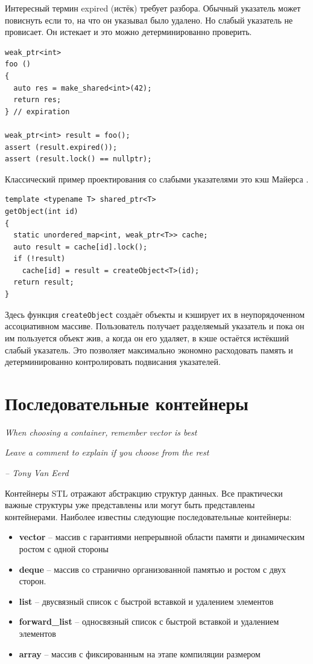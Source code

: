 \documentclass[a4paper,12pt,oneside]{book}
\begin{document}
Интересный термин expired (истёк) требует разбора. Обычный указатель может повиснуть если то, на что он указывал было удалено. Но слабый указатель не провисает. Он истекает и это можно детерминированно проверить.

\begin{lstlisting}
weak_ptr<int> 
foo () 
{
  auto res = make_shared<int>(42);
  return res;
} // expiration

weak_ptr<int> result = foo();
assert (result.expired());
assert (result.lock() == nullptr);
\end{lstlisting}

Классический пример проектирования со слабыми указателями это кэш Майерса \cite{effmoderncpp}.

\begin{lstlisting}
template <typename T> shared_ptr<T> 
getObject(int id) 
{
  static unordered_map<int, weak_ptr<T>> cache;
  auto result = cache[id].lock();
  if (!result) 
    cache[id] = result = createObject<T>(id); 
  return result;
}
\end{lstlisting}

Здесь функция \lstinline!createObject! создаёт объекты и кэширует их в неупорядоченном ассоциативном массиве. Пользователь получает разделяемый указатель и пока он им пользуется объект жив, а когда он его удаляет, в кэше остаётся истёкший слабый указатель. Это позволяет максимально экономно расходовать память и детерминированно контролировать подвисания указателей.


\pagebreak
\section{Последовательные контейнеры}\label{SeqContainers}

\hfill\textit{When choosing a container, remember vector is best}

\hfill\textit{Leave a comment to explain if you choose from the rest}{\vspace{0.5em}}

\hfill\textit{-- Tony Van Eerd}

Контейнеры STL отражают абстракцию структур данных. Все практически важные структуры уже представлены или могут быть представлены контейнерами. Наиболее известны следующие последовательные контейнеры:

\begin{itemize}
\item \textbf{vector} -- массив с гарантиями непрерывной области памяти и динамическим ростом с одной стороны
\item \textbf{deque} -- массив со странично организованной памятью и ростом с двух сторон.
\item \textbf{list} -- двусвязный список с быстрой вставкой и удалением элементов
\item \textbf{forward\_list} -- односвязный список с быстрой вставкой и удалением элементов
\item \textbf{array} -- массив с фиксированным на этапе компиляции размером
\end{itemize}
\end{document}
